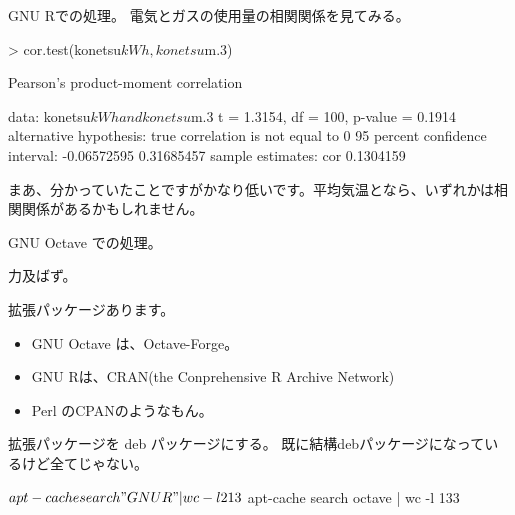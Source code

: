\begin{frame}[containsverbatim]{GNU Rでの処理。}
電気とガスの使用量の相関関係を見てみる。
\begin{commandline}

> cor.test(konetsu$kWh, konetsu$m.3)

	Pearson's product-moment correlation

data:  konetsu$kWh and konetsu$m.3 
t = 1.3154, df = 100, p-value = 0.1914
alternative hypothesis: true correlation is not equal to 0 
95 percent confidence interval:
 -0.06572595  0.31685457 
sample estimates:
      cor 
0.1304159 
\end{commandline}
 まあ、分かっていたことですがかなり低いです。平均気温となら、いずれかは相
 関関係があるかもしれません。
\end{frame}

\begin{frame}{GNU Octave での処理。}

{\huge 力及ばず。}

\end{frame}

\begin{frame}{拡張パッケージあります。}
 \begin{itemize}
  \item GNU Octave は、Octave-Forge。
  \item GNU Rは、CRAN(the Conprehensive R Archive Network)
  \item Perl のCPANのようなもん。
 \end{itemize}
\end{frame}

\begin{frame}[containsverbatim]{拡張パッケージを deb パッケージにする。}
既に結構debパッケージになっているけど全てじゃない。
\begin{commandline}
$ apt-cache search "GNU R" | wc -l
213
$ apt-cache search octave | wc -l
133
\end{commandline}

\end{frame}


